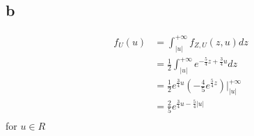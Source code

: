 \documentclass[12pt,letterpaper]{article}
\begin{document}
    \subsection*{b}
    \begin{equation*}
        \begin{aligned}
            f_{U}(u) &= \int_{|u|}^{+\infty}f_{Z, U}(z, u) dz \\
            &= \frac{1}{2} \int_{|u|}^{+\infty} e^{-\frac{5}{4}z + \frac{3}{4}u} dz \\
            &= \frac{1}{2}e^{\frac{3}{4}u}(-\frac{4}{5}e^{\frac{5}{4}z})|_{|u|}^{+\infty} \\
            &= \frac{2}{5}e^{\frac{3}{4}u - \frac{5}{4}|u|} \\
        \end{aligned}
    \end{equation*}
    for $u \in R$
\end{document}
